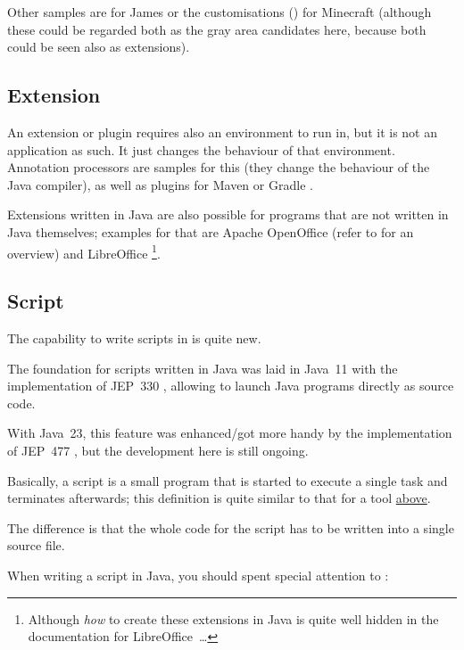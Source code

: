Other samples are  for James \autocite{APACHE_JAMES} or the customisations () for Minecraft \autocite{MINECRAFT} (although these could be regarded both as the gray area candidates here, because both could be seen also as extensions).


\subsection{Extension}\label{sec:Extension}
An extension or plugin requires also an environment to run in, but it is not an application as such. It just changes the behaviour of that environment. Annotation processors \autocite{ORACLE_DOC_PROCESSOR_INTERFACE} are samples for this (they change the behaviour of the Java compiler), as well as plugins for Maven \autocite{APACHE_MAVEN} or Gradle \autocite{GRADLE}.

Extensions written in Java are also possible for programs that are not written in Java themselves; examples for that are Apache OpenOffice \autocite{APACHE_OPENOFFICE} (refer to \autocite{APACHE_OPENOFFICE:ExtensionsInJava} for an overview) and LibreOffice \autocite{LIBREOFFICE}\footnote{Although \textit{how} to create these extensions in Java is quite well hidden in the documentation for LibreOffice~…}.


\subsection{Script}\label{sec:ScriptInJava}
The capability to write scripts in \Java is quite new.

The foundation for scripts written in Java was laid in Java~11 with the implementation of JEP~330 \autocite{JEP330}, allowing to launch Java programs directly as source code.

With Java~23, this feature was enhanced/got more handy by the implementation of JEP~477 \autocite{JEP477}, but the development here is still ongoing.

Basically, a script is a small program that is started to execute a single task and terminates afterwards; this definition is quite similar to that for a tool \hyperref[sec:Tool]{above}.

The difference is that the whole code for the script has to be written into a single source file.

When writing a script in Java, you should spent special attention to : 

